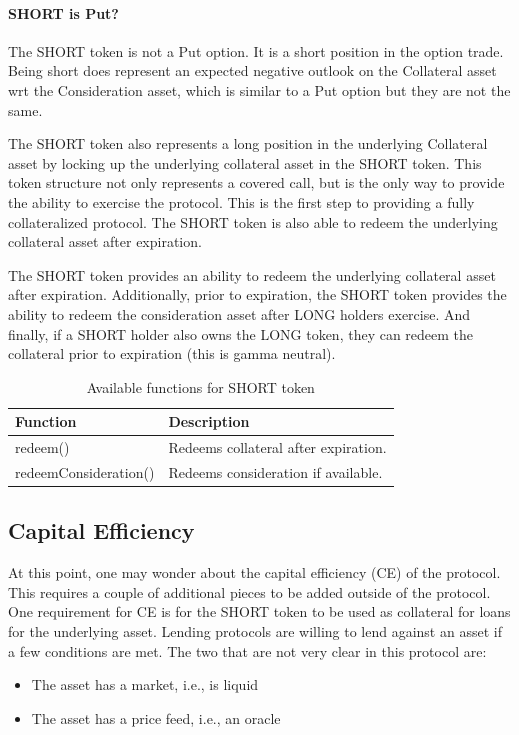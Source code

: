 \paragraph*{SHORT is Put?} The SHORT token is not a Put option. It is a short position in the option trade. 
Being short does represent an expected negative outlook on the Collateral asset wrt the Consideration asset, 
which is similar to a Put option but they are not the same.



The SHORT token also represents a long position in the underlying Collateral asset by locking up the underlying collateral asset in the SHORT token.
This token structure not only represents a covered call, but is the only way to provide the ability to exercise the protocol.
This is the first step to providing a fully collateralized protocol.
The SHORT token is also able to redeem the underlying collateral asset after expiration.

The SHORT token provides an ability to redeem the underlying collateral asset after expiration.
Additionally, prior to expiration, the SHORT token provides the ability to redeem the consideration asset after LONG holders exercise.
And finally, if a SHORT holder also owns the LONG token, they can redeem the collateral prior to expiration (this is gamma neutral).

\begin{table}[h]
\centering
\begin{tabular}{|p{4cm}|p{4cm}|}
\hline
\textbf{Function} & \textbf{Description} \\
\hline
redeem() & Redeems collateral after expiration. \\
\hline
redeemConsideration() & Redeems consideration if available. \\ 
\hline
\end{tabular}
\caption{Available functions for SHORT token}
\label{tab:functions}
\end{table}


\subsection{Capital Efficiency}

At this point, one may wonder about the capital efficiency (CE) of the protocol. 
This requires a couple of additional pieces to be added outside of the protocol.
One requirement for CE is for the SHORT token to be used as collateral for loans for the underlying asset.
Lending protocols are willing to lend against an asset if a few conditions are met. 
The two that are not very clear in this protocol are:
\begin{itemize}
  \setlength{\itemsep}{0pt}
  \setlength{\parskip}{0pt}
  \item The asset has a market, i.e., is liquid
  \item The asset has a price feed, i.e., an oracle
\end{itemize}


